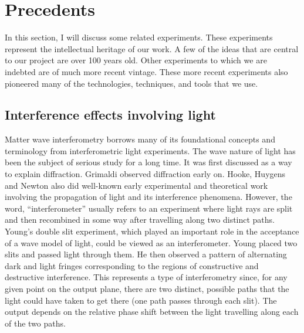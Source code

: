 \section{Precedents}
In this section, I will discuss some related experiments. These experiments represent the intellectual heritage of our work.
A few of the ideas that are central to our project are over 100 years old. Other experiments to which we are indebted are of much more recent vintage. These more recent experiments also pioneered many of the technologies, techniques, and tools that we use. 
 \subsection{Interference effects involving light}
Matter wave interferometry borrows many of its foundational concepts and terminology from interferometric light experiments.
The wave nature of light has been the subject of serious study for a long time. It was first discussed as a way to explain diffraction.
Grimaldi observed diffraction early on. Hooke, Huygens and Newton also did well-known early experimental and theoretical work involving the propagation of light and its interference phenomena. 
However, the word, ``interferometer'' usually refers to an experiment where light rays are split and then recombined in some way after travelling along two distinct paths. 
Young's double slit experiment, which played an important role in the acceptance of a wave model of light, could be viewed as an interferometer. 
Young placed two slits and passed light through them. He then observed a pattern of alternating dark and light fringes corresponding to the regions of constructive and destructive interference. This represents a type of interferometry since, for any given point on the output plane, there are two distinct, possible paths that the light could have taken to get there (one path passes through each slit). The output depends on the relative phase shift between the light travelling along each of the two paths. 

